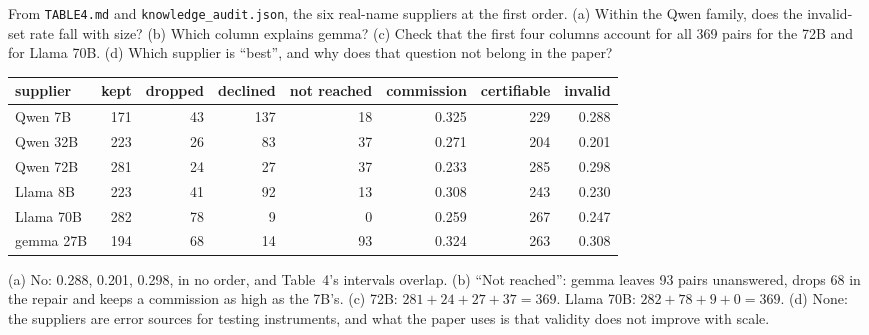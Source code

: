 \begin{exercicio}[metodo=table-reading,conceito=escala-validade]
From \texttt{TABLE4.md} and \texttt{knowledge\_audit.json}, the six real-name suppliers at the first
order. (a) Within the Qwen
family, does the invalid-set rate fall with size? (b) Which column explains gemma? (c) Check that the
first four columns account for all 369 pairs for the 72B and for Llama 70B. (d) Which supplier is
``best'', and why does that question not belong in the paper?

\begin{center}
\small
\begin{tabular}{@{}lrrrrrrr@{}}
\toprule
supplier & kept & dropped & declined & not reached & commission & certifiable & invalid \\
\midrule
Qwen 7B   & 171 & 43 & 137 & 18 & 0.325 & 229 & 0.288 \\
Qwen 32B  & 223 & 26 &  83 & 37 & 0.271 & 204 & 0.201 \\
Qwen 72B  & 281 & 24 &  27 & 37 & 0.233 & 285 & 0.298 \\
Llama 8B  & 223 & 41 &  92 & 13 & 0.308 & 243 & 0.230 \\
Llama 70B & 282 & 78 &   9 &  0 & 0.259 & 267 & 0.247 \\
gemma 27B & 194 & 68 &  14 & 93 & 0.324 & 263 & 0.308 \\
\bottomrule
\end{tabular}
\end{center}
\end{exercicio}
\begin{solucao}
(a) No: 0.288, 0.201, 0.298, in no order, and Table~4's intervals overlap. (b) ``Not reached'': gemma
leaves 93 pairs unanswered, drops 68 in the repair and keeps a commission as high as the 7B's.
(c) 72B: $281 + 24 + 27 + 37 = 369$. Llama 70B: $282 + 78 + 9 + 0 = 369$. (d) None: the suppliers are
error sources for testing instruments, and what the paper uses is that validity does not improve with
scale.
\end{solucao}

